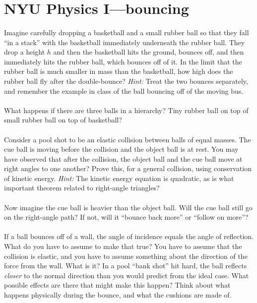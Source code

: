 \documentclass[12pt]{article}
\begin{document}
\section*{NYU Physics I---bouncing}

\paragraph{\theproblem}%
Imagine carefully dropping a basketball and a small rubber ball so
that they fall ``in a stack'' with the basketball immediately
underneath the rubber ball.  They drop a height $h$ and then the
basketball hits the ground, bounces off, and then immediately hits the
rubber ball, which bounces off of it.  In the limit that the rubber
ball is much smaller in mass than the basketball, how high does the
rubber ball fly after the double-bounce?  \emph{Hint:} Treat the two
bounces separately, and remember the example in class of the ball
bouncing off of the moving bus.

\paragraph{\theproblem}%
What happens if there are three balls in a hierarchy?  Tiny rubber
ball on top of small rubber ball on top of basketball?

\paragraph{\theproblem}%
Consider a pool shot to be an elastic collision between balls of equal
masses.  The cue ball is moving before the collision and the object
ball is at rest.  You may have observed that after the collision, the
object ball and the cue ball move at right angles to one another?
Prove this, for a general collision, using conservation of kinetic
energy.  \emph{Hint:} The kinetic energy equation is quadratic, as is
what important theorem related to right-angle triangles?

\paragraph{\theproblem}%
Now imagine the cue ball is heavier than the object ball.  Will the
cue ball still go on the right-angle path?  If not, will it ``bounce
back more'' or ``follow on more''?

\paragraph{\theproblem}%
If a ball bounces off of a wall, the angle of incidence equals the
angle of reflection.  What do you have to assume to make that true?
You have to assume that the collision is elastic, and you have to
assume something about the direction of the force from the wall.  What
is it?  In a pool ``bank shot'' hit hard, the ball reflects
\emph{closer} to the normal direction than you would predict from the
ideal case.  What possible effects are there that might make this
happen?  Think about what happens physically during the bounce, and
what the cushions are made of.
\end{document}
